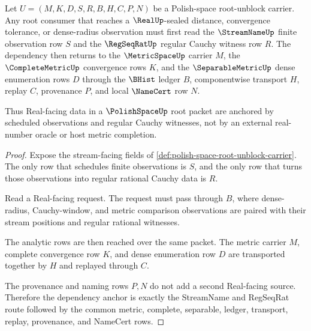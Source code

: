 \begin{theorem}
\label{thm:polishspace-streamname-real-dependency-anchor}
Let $U=(M,K,D,S,R,B,H,C,P,N)$ be a Polish-space root-unblock carrier. Any root consumer that reaches a $\RealUp$-sealed distance, convergence tolerance, or dense-radius observation must first read the $\StreamNameUp$ finite observation row $S$ and the $\RegSeqRatUp$ regular Cauchy witness row $R$. The dependency then returns to the $\MetricSpaceUp$ carrier $M$, the $\CompleteMetricUp$ convergence rows $K$, and the $\SeparableMetricUp$ dense enumeration rows $D$ through the $\BHist$ ledger $B$, componentwise transport $H$, replay $C$, provenance $P$, and local $\NameCert$ row $N$.

Thus Real-facing data in a $\PolishSpaceUp$ root packet are anchored by scheduled observations and regular Cauchy witnesses, not by an external real-number oracle or host metric completion.
\end{theorem}
\begin{proof}
Expose the stream-facing fields of \autoref{def:polish-space-root-unblock-carrier}. The only row that schedules finite observations is $S$, and the only row that turns those observations into regular rational Cauchy data is $R$.

Read a Real-facing request. The request must pass through $B$, where dense-radius, Cauchy-window, and metric comparison observations are paired with their stream positions and regular rational witnesses.

The analytic rows are then reached over the same packet. The metric carrier $M$, complete convergence row $K$, and dense enumeration row $D$ are transported together by $H$ and replayed through $C$.

The provenance and naming rows $P,N$ do not add a second Real-facing source. Therefore the dependency anchor is exactly the StreamName and RegSeqRat route followed by the common metric, complete, separable, ledger, transport, replay, provenance, and NameCert rows.
\end{proof}

